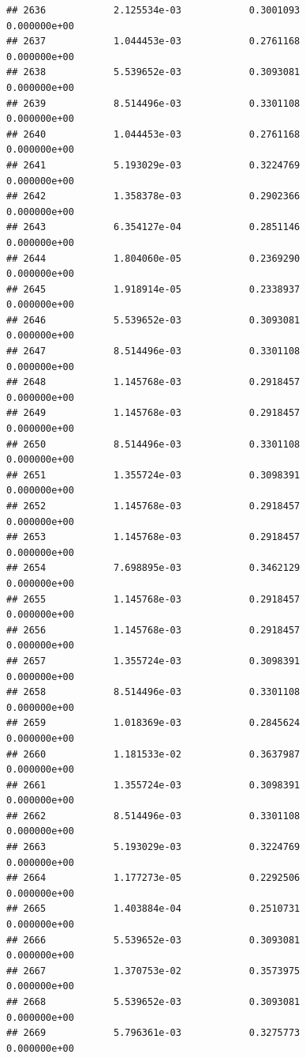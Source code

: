 \documentclass[
]{article}
\begin{document}
\begin{verbatim}
## 2636            2.125534e-03            0.3001093            0.000000e+00
## 2637            1.044453e-03            0.2761168            0.000000e+00
## 2638            5.539652e-03            0.3093081            0.000000e+00
## 2639            8.514496e-03            0.3301108            0.000000e+00
## 2640            1.044453e-03            0.2761168            0.000000e+00
## 2641            5.193029e-03            0.3224769            0.000000e+00
## 2642            1.358378e-03            0.2902366            0.000000e+00
## 2643            6.354127e-04            0.2851146            0.000000e+00
## 2644            1.804060e-05            0.2369290            0.000000e+00
## 2645            1.918914e-05            0.2338937            0.000000e+00
## 2646            5.539652e-03            0.3093081            0.000000e+00
## 2647            8.514496e-03            0.3301108            0.000000e+00
## 2648            1.145768e-03            0.2918457            0.000000e+00
## 2649            1.145768e-03            0.2918457            0.000000e+00
## 2650            8.514496e-03            0.3301108            0.000000e+00
## 2651            1.355724e-03            0.3098391            0.000000e+00
## 2652            1.145768e-03            0.2918457            0.000000e+00
## 2653            1.145768e-03            0.2918457            0.000000e+00
## 2654            7.698895e-03            0.3462129            0.000000e+00
## 2655            1.145768e-03            0.2918457            0.000000e+00
## 2656            1.145768e-03            0.2918457            0.000000e+00
## 2657            1.355724e-03            0.3098391            0.000000e+00
## 2658            8.514496e-03            0.3301108            0.000000e+00
## 2659            1.018369e-03            0.2845624            0.000000e+00
## 2660            1.181533e-02            0.3637987            0.000000e+00
## 2661            1.355724e-03            0.3098391            0.000000e+00
## 2662            8.514496e-03            0.3301108            0.000000e+00
## 2663            5.193029e-03            0.3224769            0.000000e+00
## 2664            1.177273e-05            0.2292506            0.000000e+00
## 2665            1.403884e-04            0.2510731            0.000000e+00
## 2666            5.539652e-03            0.3093081            0.000000e+00
## 2667            1.370753e-02            0.3573975            0.000000e+00
## 2668            5.539652e-03            0.3093081            0.000000e+00
## 2669            5.796361e-03            0.3275773            0.000000e+00

\end{verbatim}
\end{document}
